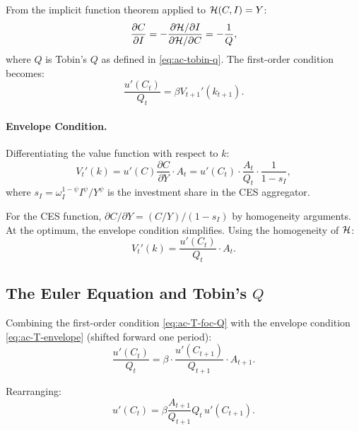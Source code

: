 From the implicit function theorem applied to $\mathcal{H}(C, I) = Y$:
\begin{equation}
\frac{\partial C}{\partial I} = -\frac{\partial \mathcal{H} / \partial I}{\partial \mathcal{H} / \partial C} = -\frac{1}{Q},
\label{eq:ac-T-dCdI}
\end{equation}
where $Q$ is Tobin's $Q$ as defined in \cref{eq:ac-tobin-q}. The first-order condition becomes:
\begin{equation}
\frac{u'(C_t)}{Q_t} = \beta V_{t+1}'(k_{t+1}).
\label{eq:ac-T-foc-Q}
\end{equation}

\paragraph{Envelope Condition.}
Differentiating the value function with respect to $k$:
\begin{equation}
V_t'(k) = u'(C) \frac{\partial C}{\partial Y} \cdot A_t = u'(C_t) \cdot \frac{A_t}{Q_t} \cdot \frac{1}{1 - s_I},
\label{eq:ac-T-envelope-raw}
\end{equation}
where $s_I = \omega_I^{1-\psi} I^\psi / Y^\psi$ is the investment share in the CES aggregator.

For the CES function, $\partial C / \partial Y = (C/Y) / (1 - s_I)$ by homogeneity arguments. At the optimum, the envelope condition simplifies. Using the homogeneity of $\mathcal{H}$:
\begin{equation}
V_t'(k) = \frac{u'(C_t)}{Q_t} \cdot A_t.
\label{eq:ac-T-envelope}
\end{equation}

\subsection{The Euler Equation and Tobin's $Q$}
\label{subsec:ac-T-euler}

Combining the first-order condition \cref{eq:ac-T-foc-Q} with the envelope condition \cref{eq:ac-T-envelope} (shifted forward one period):
\begin{equation}
\frac{u'(C_t)}{Q_t} = \beta \cdot \frac{u'(C_{t+1})}{Q_{t+1}} \cdot A_{t+1}.
\label{eq:ac-T-euler-combined}
\end{equation}

Rearranging:
\begin{equation}
\boxed{u'(C_t) = \beta \frac{A_{t+1}}{Q_{t+1}} Q_t \, u'(C_{t+1}).}
\label{eq:ac-T-euler}
\end{equation}

